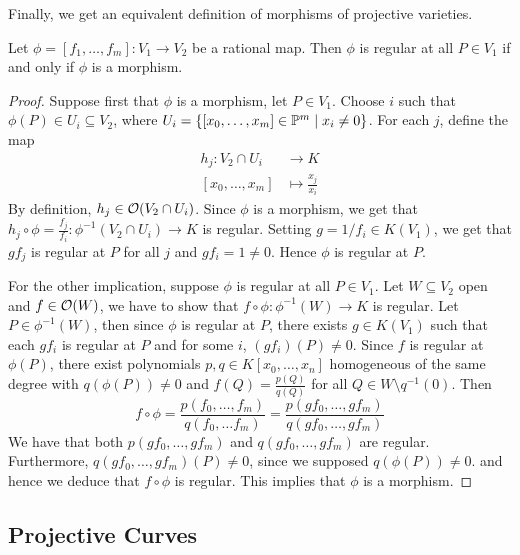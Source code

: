 Finally, we get an equivalent definition of morphisms of projective
varieties.

\begin{proposition}
	Let $\phi = [f_1, \dots, f_m]: V_1 \to V_2$ be a rational map. Then
	$\phi$ is regular at all $P \in V_1$ if and only if
	$\phi$ is a morphism.
\end{proposition}

\begin{proof}
	Suppose first that $\phi$ is a morphism, let $P \in V_1$.
	Choose $i$ such that $\phi(P) \in U_i \subseteq V_2$, 
	where $U_i = \{[x_0, \dots, x_m] \in \mathbb{P}^m \mid x_i \neq 0\}$.
	For each $j$, define the map
	\begin{align*}
		h_j: V_2\cap U_i &\to K\\
		[x_0, \dots, x_m] &\mapsto \frac{x_j}{x_i}
	\end{align*}
	By definition, $h_j \in \mathcal{O}(V_2\cap U_i)$.
	Since $\phi$ is a morphism, we get that
	$h_j \circ \phi = \frac{f_j}{f_i}: \phi^{-1}(V_2\cap U_i) \to K$ is regular.
	Setting $g = 1/f_i \in K(V_1)$, we get that
	$gf_j$ is regular at $P$ for all $j$ and $gf_i = 1 \neq 0$.
	Hence $\phi$ is regular at $P$.

	For the other implication, suppose $\phi$ is regular at all $P \in V_1$.
	Let $W \subseteq V_2$ open and $f \in \mathcal{O}(W)$, we have to show that
	$f\circ\phi: \phi^{-1}(W) \to K$ is regular.
	Let $P \in \phi^{-1}(W)$, then since $\phi$ is regular at $P$,
	there exists $g \in K(V_1)$ such that each $gf_i$ is regular at $P$
	and for some $i$, $(gf_i)(P) \neq 0$.
	Since $f$ is regular at $\phi(P)$, there exist polynomials
	$p, q \in K[x_0, \dots, x_n]$ homogeneous of the same degree
	with $q(\phi(P)) \neq 0$ and 
	$f(Q) = \frac{p(Q)}{q(Q)}$ for all $Q \in W\setminus q^{-1}(0)$. Then
	\begin{equation*}
		f \circ \phi = \frac{p(f_0, \dots, f_m)}{q(f_0, \dots f_m)}
		= \frac{p(gf_0, \dots, gf_m)}{q(gf_0, \dots, gf_m)}
	\end{equation*}
	We have that both $p(gf_0, \dots, gf_m)$ and $q(gf_0, \dots, gf_m)$ are
	regular. Furthermore, $q(gf_0, \dots, gf_m)(P) \neq 0$,
	since we supposed $q(\phi(P)) \neq 0$.
	and hence we deduce that $f\circ \phi$ is regular.
	This implies that $\phi$ is a morphism.
\end{proof}

\subsection{Projective Curves}


